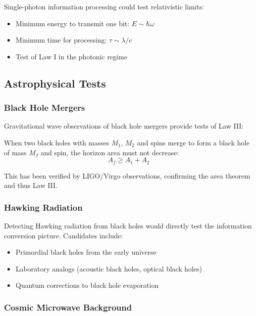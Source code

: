 \documentclass[11pt,a4paper]{article}
\theoremstyle{plain}
\theoremstyle{definition}
\theoremstyle{remark}
\begin{document}
Single-photon information processing could test relativistic limits:

\begin{itemize}[leftmargin=*]
\item Minimum energy to transmit one bit: $E \sim \hbar\omega$
\item Minimum time for processing: $\tau \sim \lambda/c$
\item Test of Law I in the photonic regime
\end{itemize}

\subsection{Astrophysical Tests}

\subsubsection{Black Hole Mergers}

Gravitational wave observations of black hole mergers provide tests of Law III:

When two black holes with masses $M_1$, $M_2$ and spins merge to form a black hole of mass $M_f$ and spin, the horizon area must not decrease:
\begin{equation}
A_f \geq A_1 + A_2
\end{equation}

This has been verified by LIGO/Virgo observations, confirming the area theorem and thus Law III.

\subsubsection{Hawking Radiation}

Detecting Hawking radiation from black holes would directly test the information conversion picture. Candidates include:

\begin{itemize}[leftmargin=*]
\item Primordial black holes from the early universe
\item Laboratory analogs (acoustic black holes, optical black holes)
\item Quantum corrections to black hole evaporation
\end{itemize}

\subsubsection{Cosmic Microwave Background}
\end{document}
